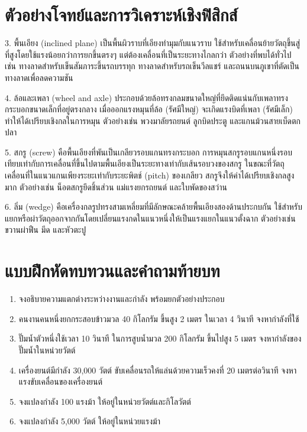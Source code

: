 \section{ตัวอย่างโจทย์และการวิเคราะห์เชิงฟิสิกส์}

\begin{examplebox}
3. พื้นเอียง (inclined plane) เป็นพื้นผิวราบที่เอียงทำมุมกับแนวราบ ใช้สำหรับเคลื่อนย้ายวัตถุขึ้นสู่ที่สูงโดยใช้แรงน้อยกว่าการยกขึ้นตรงๆ แต่ต้องเคลื่อนที่เป็นระยะทางไกลกว่า ตัวอย่างที่พบได้ทั่วไป เช่น ทางลาดสำหรับเข็นสัมภาระขึ้นรถบรรทุก ทางลาดสำหรับรถเข็นวีลแชร์ และถนนบนภูเขาที่ตัดเป็นทางลาดเพื่อลดความชัน

4. ล้อและเพลา (wheel and axle) ประกอบด้วยล้อทรงกลมขนาดใหญ่ที่ยึดติดแน่นกับเพลาทรงกระบอกขนาดเล็กที่อยู่ตรงกลาง เมื่อออกแรงหมุนที่ล้อ (รัศมีใหญ่) จะเกิดแรงบิดที่เพลา (รัศมีเล็ก) ทำให้ได้เปรียบเชิงกลในการหมุน ตัวอย่างเช่น พวงมาลัยรถยนต์ ลูกบิดประตู และแกนม้วนสายเบ็ดตกปลา

5. สกรู (screw) คือพื้นเอียงที่พันเป็นเกลียวรอบแกนทรงกระบอก การหมุนสกรูรอบแกนหนึ่งรอบเทียบเท่ากับการเคลื่อนที่ขึ้นไปตามพื้นเอียงเป็นระยะทางเท่ากับเส้นรอบวงของสกรู ในขณะที่วัตถุเคลื่อนที่ในแนวแกนเพียงระยะเท่ากับระยะพิตช์ (pitch) ของเกลียว สกรูจึงให้ค่าได้เปรียบเชิงกลสูงมาก ตัวอย่างเช่น น็อตสกรูยึดชิ้นส่วน แม่แรงยกรถยนต์ และใบพัดของสว่าน

6. ลิ่ม (wedge) คือเครื่องกลรูปทรงสามเหลี่ยมที่มีลักษณะคล้ายพื้นเอียงสองด้านประกบกัน ใช้สำหรับแยกหรือผ่าวัตถุออกจากกันโดยเปลี่ยนแรงกดในแนวหนึ่งให้เป็นแรงแยกในแนวตั้งฉาก ตัวอย่างเช่น ขวานผ่าฟืน มีด และหัวตะปู
\end{examplebox}

\section{แบบฝึกหัดทบทวนและคำถามท้ายบท}

\begin{enumerate}
    \item จงอธิบายความแตกต่างระหว่างงานและกำลัง พร้อมยกตัวอย่างประกอบ
    \item คนงานคนหนึ่งยกกระสอบข้าวมวล 40 กิโลกรัม ขึ้นสูง 2 เมตร ในเวลา 4 วินาที จงหากำลังที่ใช้
    \item ปั๊มน้ำตัวหนึ่งใช้เวลา 10 วินาที ในการสูบน้ำมวล 200 กิโลกรัม ขึ้นไปสูง 5 เมตร จงหากำลังของปั๊มน้ำในหน่วยวัตต์
    \item เครื่องยนต์มีกำลัง 30,000 วัตต์ ขับเคลื่อนรถให้แล่นด้วยความเร็วคงที่ 20 เมตรต่อวินาที จงหาแรงขับเคลื่อนของเครื่องยนต์
    \item จงแปลงกำลัง 100 แรงม้า ให้อยู่ในหน่วยวัตต์และกิโลวัตต์
    \item จงแปลงกำลัง 5,000 วัตต์ ให้อยู่ในหน่วยแรงม้า
\end{enumerate}

